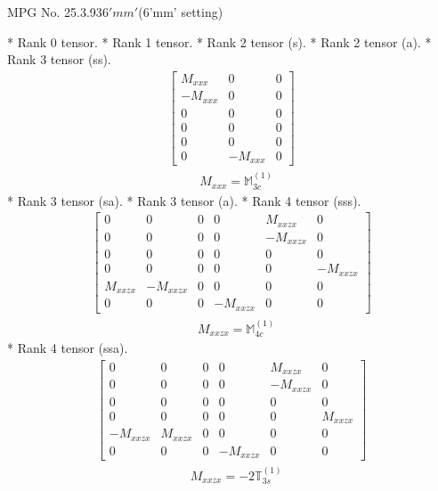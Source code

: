 \documentclass[fleqn,8pt,landscape]{jsarticle}
\begin{document}
\setcounter{MaxMatrixCols}{32}

\renewcommand{\tablename}{Table~}
\renewcommand{\figurename}{Figure~}
\begin{center}
\LARGE
MPG No. 25.3.93\quad$6'mm'$\quad(6'mm' setting)
\end{center}
* Rank 0 tensor.
* Rank 1 tensor.
* Rank 2 tensor (s).
* Rank 2 tensor (a).
* Rank 3 tensor (ss).
\begin{align*}
\begin{bmatrix} M_{xxx} & 0 & 0 \\ - M_{xxx} & 0 & 0 \\ 0 & 0 & 0 \\ 0 & 0 & 0 \\ 0 & 0 & 0 \\ 0 & - M_{xxx} & 0 \end{bmatrix}
\end{align*}
\begin{align*}
& M_{xxx} = \mathbb{M}_{3c}^{(1)}
\end{align*}
* Rank 3 tensor (sa).
* Rank 3 tensor (a).
* Rank 4 tensor (sss).
\begin{align*}
\begin{bmatrix} 0 & 0 & 0 & 0 & M_{xxzx} & 0 \\ 0 & 0 & 0 & 0 & - M_{xxzx} & 0 \\ 0 & 0 & 0 & 0 & 0 & 0 \\ 0 & 0 & 0 & 0 & 0 & - M_{xxzx} \\ M_{xxzx} & - M_{xxzx} & 0 & 0 & 0 & 0 \\ 0 & 0 & 0 & - M_{xxzx} & 0 & 0 \end{bmatrix}
\end{align*}
\begin{align*}
& M_{xxzx} = \mathbb{M}_{4c}^{(1)}
\end{align*}
* Rank 4 tensor (ssa).
\begin{align*}
\begin{bmatrix} 0 & 0 & 0 & 0 & M_{xxzx} & 0 \\ 0 & 0 & 0 & 0 & - M_{xxzx} & 0 \\ 0 & 0 & 0 & 0 & 0 & 0 \\ 0 & 0 & 0 & 0 & 0 & M_{xxzx} \\ - M_{xxzx} & M_{xxzx} & 0 & 0 & 0 & 0 \\ 0 & 0 & 0 & - M_{xxzx} & 0 & 0 \end{bmatrix}
\end{align*}
\begin{align*}
& M_{xxzx} = - 2 \mathbb{T}_{3s}^{(1)}
\end{align*}
\end{document}
